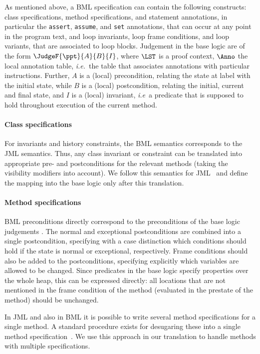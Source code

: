 As mentioned above, a BML specification can contain the following
constructs: class specifications, method specifications, and statement
annotations, in particular the \texttt{assert},
\texttt{assume}, and  \texttt{set} annotations, that can occur at any 
point in the program text, and loop invariants, loop frame 
conditions, and loop variants, that are associated to loop blocks.
Judgement in the \mobius base logic are of the form
\(\JudgeF{\ppt}{A}{B}{I}\), where \(\LST\) is a proof context,
\(\Anno\) the local annotation table, \emph{i.e.}~the table that
associates annotations with particular instructions. Further, \(A\) is
a (local) precondition, relating the state at label \ppt with the
initial state, while \(B\) is a (local) postcondition, relating the
initial, current and final state, and \(I\) is a (local) invariant,
\emph{i.e}\ a predicate that is supposed to hold throughout execution
of the current method.

\paragraph{Class specifications}
For invariants and history constraints, the BML semantics corresponds
to the JML semantics. Thus, any class invariant or constraint can be
translated into appropriate pre- and postconditions for the relevant
methods (taking the visibility modifiers into account). We follow this
semantics for JML~\cite[\S 8]{JMLReferenceManual05} and define the
mapping into the \mobius base logic only after this translation. 

\paragraph{Method specifications}
BML preconditions directly correspond to the preconditions of the
\mobius base logic judgements . The normal and exceptional
postconditions are combined into a single postcondition, specifying
with a case distinction which conditions should hold if the state is
normal or exceptional, respectively. Frame conditions should also be
added to the postconditions, specifying explicitly which variables are
allowed to be changed. Since predicates in the \mobius base logic
specify properties over the whole heap, this can be expressed
directly: all locations that are not mentioned in the frame condition
of the method (evaluated in the prestate of the method) should be
unchanged.

In JML and also in BML it is possible to write several method
specifications for a single method. A standard procedure exists for
desugaring these into a single method
specification~\cite{RaghavanL00}. We use this approach in our
translation to handle methods with multiple specifications.

